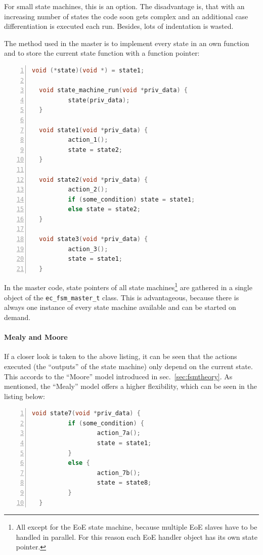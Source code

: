 \documentclass[a4paper,12pt,BCOR6mm,bibtotoc,idxtotoc]{scrbook}
\begin{document}
For small state machines, this is an option. The disadvantage is, that
with an increasing number of states the code soon gets complex and an
additional case differentiation is executed each run. Besides, lots of
indentation is wasted.

The method used in the master is to implement every state in an own
function and to store the current state function with a function
pointer:

\begin{lstlisting}[gobble=2,language=C,numbers=left]
  void (*state)(void *) = state1;

  void state_machine_run(void *priv_data) {
          state(priv_data);
  }

  void state1(void *priv_data) {
          action_1();
          state = state2;
  }

  void state2(void *priv_data) {
          action_2();
          if (some_condition) state = state1;
          else state = state2;
  }

  void state3(void *priv_data) {
          action_3();
          state = state1;
  }
\end{lstlisting}

In the master code, state pointers of all state machines\footnote{All except
for the EoE state machine, because multiple EoE slaves have to be handled in
parallel. For this reason each EoE handler object has its own state pointer.}
are gathered in a single object of the \lstinline+ec_fsm_master_t+ class. This
is advantageous, because there is always one instance of every state machine
available and can be started on demand.

\paragraph{Mealy and Moore}

If a closer look is taken to the above listing, it can be seen that the
actions executed (the ``outputs'' of the state machine) only depend on the
current state. This accords to the ``Moore'' model introduced in
sec.~\ref{sec:fsmtheory}. As mentioned, the ``Mealy'' model offers a higher
flexibility, which can be seen in the listing below:

\begin{lstlisting}[gobble=2,language=C,numbers=left]
  void state7(void *priv_data) {
          if (some_condition) {
                  action_7a();
                  state = state1;
          }
          else {
                  action_7b();
                  state = state8;
          }
  }
\end{lstlisting}
\end{document}
